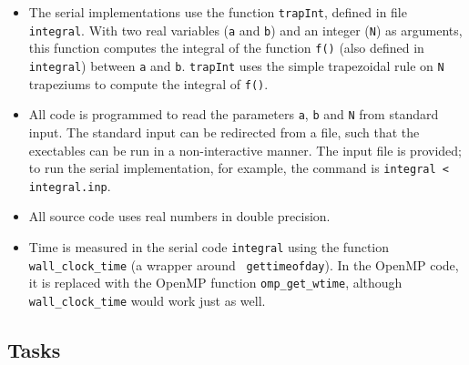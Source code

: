 \documentclass[a4paper, 12pt]{article}
\def \cc   {\tt }               %
\begin{document}
\begin{itemize}

  \item The serial implementations use the function {\cc trapInt},
    defined in file {\cc integral}.  With two real variables ({\cc a}
    and {\cc b}) and an integer ({\cc N}) as arguments, this function
    computes the integral of the function {\cc f()} (also defined in
    {\cc integral}) between {\cc a} and {\cc b}.  {\cc trapInt} uses
    the simple trapezoidal rule on {\cc N} trapeziums to compute the
    integral of {\cc f()}.
    
  \item All code is programmed to read the parameters {\cc a}, {\cc b}
    and {\cc N} from standard input.  The standard input can be
    redirected from a file, such that the exectables can be run in a
    non-interactive manner.  The input file is provided; to run the
    serial implementation, for example, the command is {\cc integral <
      integral.inp}.

  \item All source code uses real numbers in double precision.

  \item Time is measured in the serial code {\cc integral} using the
    function {\cc wall\_clock\_time} (a wrapper around {\cc
      gettimeofday}). In the OpenMP code, it is replaced
    with the OpenMP function {\cc omp\_get\_wtime}, although {\cc
      wall\_clock\_time} would work just as well.
\end{itemize}


\subsection*{Tasks}
\end{document}
